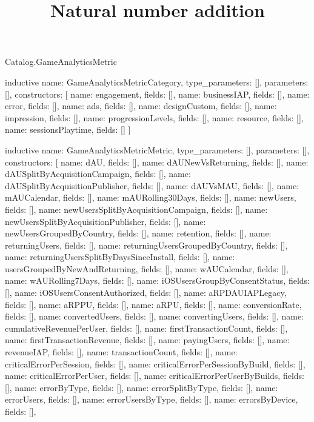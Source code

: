 \begin{lexlean}{Catalog.GameAnalyticsMetric}
\title{Natural number addition}
\begin{semanticmodule}
inductive{
  name: GameAnalyticsMetricCategory,
  type_parameters: [],
  parameters: [],
  constructors: [
    {name: engagement, fields: []},
    {name: businessIAP, fields: []},
    {name: error, fields: []},
    {name: ads, fields: []},
    {name: designCustom, fields: []},
    {name: impression, fields: []},
    {name: progressionLevels, fields: []},
    {name: resource, fields: []},
    {name: sessionsPlaytime, fields: []}
  ]
}

inductive{
  name: GameAnalyticsMetricMetric,
  type_parameters: [],
  parameters: [],
  constructors: [
    {name: dAU, fields: []},
    {name: dAUNewVsReturning, fields: []},
    {name: dAUSplitByAcquisitionCampaign, fields: []},
    {name: dAUSplitByAcquisitionPublisher, fields: []},
    {name: dAUVsMAU, fields: []},
    {name: mAUCalendar, fields: []},
    {name: mAURolling30Days, fields: []},
    {name: newUsers, fields: []},
    {name: newUsersSplitByAcquisitionCampaign, fields: []},
    {name: newUsersSplitByAcquisitionPublisher, fields: []},
    {name: newUsersGroupedByCountry, fields: []},
    {name: retention, fields: []},
    {name: returningUsers, fields: []},
    {name: returningUsersGroupedByCountry, fields: []},
    {name: returningUsersSplitByDaysSinceInstall, fields: []},
    {name: usersGroupedByNewAndReturning, fields: []},
    {name: wAUCalendar, fields: []},
    {name: wAURolling7Days, fields: []},
    {name: iOSUsersGroupByConsentStatus, fields: []},
    {name: iOSUsersConsentAuthorized, fields: []},
    {name: aRPDAUIAPLegacy, fields: []},
    {name: aRPPU, fields: []},
    {name: aRPU, fields: []},
    {name: conversionRate, fields: []},
    {name: convertedUsers, fields: []},
    {name: convertingUsers, fields: []},
    {name: cumulativeRevenuePerUser, fields: []},
    {name: firstTransactionCount, fields: []},
    {name: firstTransactionRevenue, fields: []},
    {name: payingUsers, fields: []},
    {name: revenueIAP, fields: []},
    {name: transactionCount, fields: []},
    {name: criticalErrorPerSession, fields: []},
    {name: criticalErrorPerSessionByBuild, fields: []},
    {name: criticalErrorPerUser, fields: []},
    {name: criticalErrorPerUserByBuilds, fields: []},
    {name: errorByType, fields: []},
    {name: errorSplitByType, fields: []},
    {name: errorUsers, fields: []},
    {name: errorUsersByType, fields: []},
    {name: errorsByDevice, fields: []},
}
\end{semanticmodule}
\end{lexlean}
